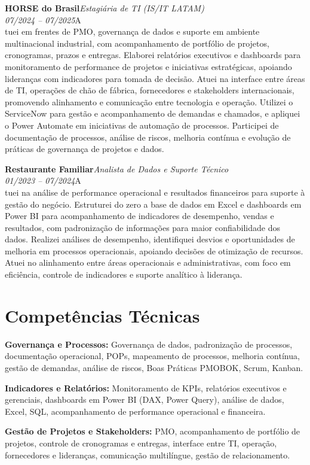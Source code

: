 \documentclass[11pt,a4paper]{article}
\newcommand{\cvrole}[4]{%
  \vspace{4pt}%
  {\bfseries\color{accentcolor}#1}\hfill{\itshape #2}\\[-2pt]%
  {\itshape #3}\hfill #4\\[6pt]%
}
\begin{document}
\cvrole{HORSE do Brasil}{Estagiária de TI (IS/IT LATAM)}{07/2024 -- 07/2025}

Atuei em frentes de PMO, governança de dados e suporte em ambiente multinacional industrial, com acompanhamento de portfólio de projetos, cronogramas, prazos e entregas. Elaborei relatórios executivos e dashboards para monitoramento de performance de projetos e iniciativas estratégicas, apoiando lideranças com indicadores para tomada de decisão. Atuei na interface entre áreas de TI, operações de chão de fábrica, fornecedores e stakeholders internacionais, promovendo alinhamento e comunicação entre tecnologia e operação. Utilizei o ServiceNow para gestão e acompanhamento de demandas e chamados, e apliquei o Power Automate em iniciativas de automação de processos. Participei de documentação de processos, análise de riscos, melhoria contínua e evolução de práticas de governança de projetos e dados.

\cvrole{Restaurante Familiar}{Analista de Dados e Suporte Técnico}{01/2023 -- 07/2024}

Atuei na análise de performance operacional e resultados financeiros para suporte à gestão do negócio. Estruturei do zero a base de dados em Excel e dashboards em Power BI para acompanhamento de indicadores de desempenho, vendas e resultados, com padronização de informações para maior confiabilidade dos dados. Realizei análises de desempenho, identifiquei desvios e oportunidades de melhoria em processos operacionais, apoiando decisões de otimização de recursos. Atuei no alinhamento entre áreas operacionais e administrativas, com foco em eficiência, controle de indicadores e suporte analítico à liderança.

\section{Competências Técnicas}

\textbf{Governança e Processos:} Governança de dados, padronização de processos, documentação operacional, POPs, mapeamento de processos, melhoria contínua, gestão de demandas, análise de riscos, Boas Práticas PMOBOK, Scrum, Kanban.

\textbf{Indicadores e Relatórios:} Monitoramento de KPIs, relatórios executivos e gerenciais, dashboards em Power BI (DAX, Power Query), análise de dados, Excel, SQL, acompanhamento de performance operacional e financeira.

\textbf{Gestão de Projetos e Stakeholders:} PMO, acompanhamento de portfólio de projetos, controle de cronogramas e entregas, interface entre TI, operação, fornecedores e lideranças, comunicação multilíngue, gestão de relacionamento.
\end{document}
